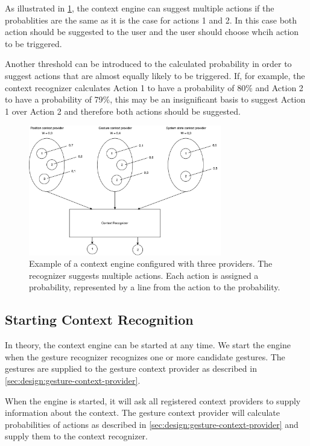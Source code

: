 As illustrated in \cref{fig:design:context-engine:multiple-suggestions}, the context engine can suggest multiple actions if the probablities are the same as it is the case for actions 1 and 2. In this case both action should be suggested to the user and the user should choose whcih action to be triggered.

Another threshold can be introduced to the calculated probability in order to suggest actions that are almost equally likely to be triggered. If, for example, the context recognizer calculates Action 1 to have a probability of 80\% and Action 2 to have a probability of 79\%, this may be an insignificant basis to suggest Action 1 over Action 2 and therefore both actions should be suggested.

\begin{figure}[h!]
\centering
\includegraphics[width=0.75\textwidth]{images/context-engine-multiple-suggestions}
\caption{Example of a context engine configured with three providers. The recognizer suggests multiple actions. Each action is assigned a probability, represented by a line from the action to the probability.}
\label{fig:design:context-engine:multiple-suggestions}
\end{figure}

\subsection{Starting Context Recognition}
\label{sec:design:context-engine:starting-contxt-recognition}

In theory, the context engine can be started at any time. We start the engine when the gesture recognizer recognizes one or more candidate gestures. The gestures are supplied to the gesture context provider as described in \cref{sec:design:gesture-context-provider}.

When the engine is started, it will ask all registered context providers to supply information about the context. The gesture context provider will calculate probabilities of actions as described in \cref{sec:design:gesture-context-provider} and supply them to the context recognizer.

